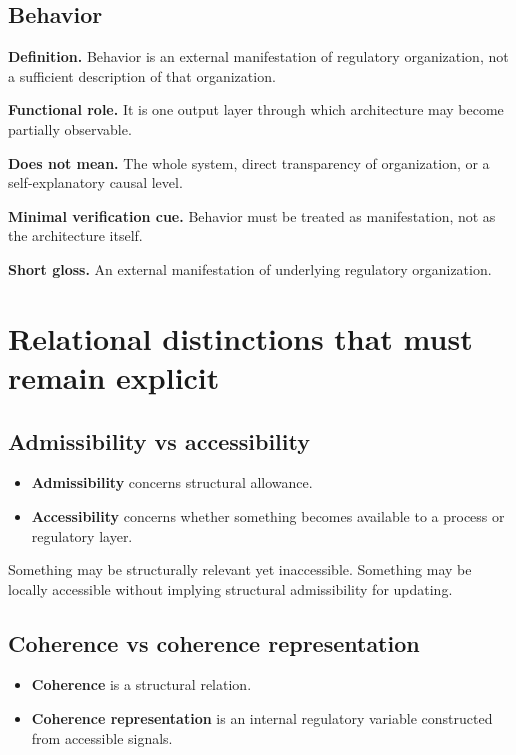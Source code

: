 \documentclass[11pt,a4paper]{article}
\begin{document}
	\subsection{Behavior}
	
	\textbf{Definition.} Behavior is an external manifestation of regulatory organization, not a sufficient description of that organization.
	
	\textbf{Functional role.} It is one output layer through which architecture may become partially observable.
	
	\textbf{Does not mean.} The whole system, direct transparency of organization, or a self-explanatory causal level.
	
	\textbf{Minimal verification cue.} Behavior must be treated as manifestation, not as the architecture itself.
	
	\textbf{Short gloss.} An external manifestation of underlying regulatory organization.
	
	\section{Relational distinctions that must remain explicit}
	
	\subsection{Admissibility vs accessibility}
	
	\begin{itemize}[leftmargin=2em]
		\item \textbf{Admissibility} concerns structural allowance.
		\item \textbf{Accessibility} concerns whether something becomes available to a process or regulatory layer.
	\end{itemize}
	
	Something may be structurally relevant yet inaccessible. Something may be locally accessible without implying structural admissibility for updating.
	
	\subsection{Coherence vs coherence representation}
	
	\begin{itemize}[leftmargin=2em]
		\item \textbf{Coherence} is a structural relation.
		\item \textbf{Coherence representation} is an internal regulatory variable constructed from accessible signals.
	\end{itemize}
	
\end{document}
